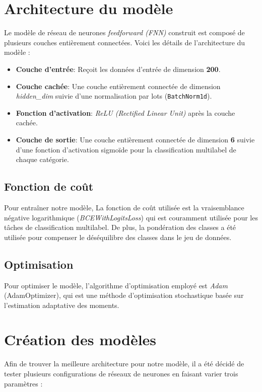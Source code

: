 \section{Architecture du modèle}

Le modèle de réseau de neurones \textit{feedforward (FNN)} construit est composé de plusieurs couches entièrement connectées. Voici les détails de l'architecture du modèle :
\begin{itemize}
    \item \textbf{Couche d'entrée}: Reçoit les données d'entrée de dimension \textbf{200}.
    \item \textbf{Couche cachée}: Une couche entièrement connectée de dimension \textit{hidden\_dim} suivie d'une normalisation par lots (\texttt{BatchNorm1d}).
    \item \textbf{Fonction d'activation}: \textit{ReLU (Rectified Linear Unit)} après la couche cachée.
    \item \textbf{Couche de sortie}: Une couche entièrement connectée de dimension \textbf{6} suivie d'une fonction d'activation sigmoïde pour la classification multilabel de chaque catégorie.
\end{itemize}

\subsection{Fonction de coût}

Pour entraîner notre modèle, La fonction de coût utilisée est la vraisemblance négative logarithmique (\textit{BCEWithLogitsLoss}) qui est couramment utilisée pour les tâches de classification multilabel.
De plus, la pondération des classes a été utilisée pour compenser le déséquilibre des classes dans le jeu de données.
\subsection{Optimisation}

Pour optimiser le modèle, l'algorithme d'optimisation employé est \textit{Adam} (AdamOptimizer), qui est une méthode d'optimisation stochastique basée sur l'estimation adaptative des moments.

\section{Création des modèles}

Afin de trouver la meilleure architecture pour notre modèle, il a été décidé de tester plusieurs configurations de réseaux de neurones en faisant varier trois paramètres :

